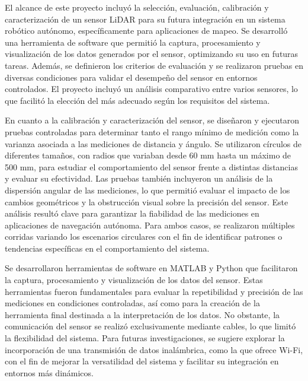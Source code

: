 El alcance de este proyecto incluyó la selección, evaluación, calibración y caracterización de un sensor LiDAR para su futura integración en un sistema robótico autónomo, específicamente para aplicaciones de mapeo. Se desarrolló una herramienta de software que permitió la captura, procesamiento y visualización de los datos generados por el sensor, optimizando su uso en futuras tareas. Además, se definieron los criterios de evaluación y se realizaron pruebas en diversas condiciones para validar el desempeño del sensor en entornos controlados. El proyecto incluyó un análisis comparativo entre varios sensores, lo que facilitó la elección del más adecuado según los requisitos del sistema.

En cuanto a la calibración y caracterización del sensor, se diseñaron y ejecutaron pruebas controladas para determinar tanto el rango mínimo de medición como la varianza asociada a las mediciones de distancia y ángulo. Se utilizaron círculos de diferentes tamaños, con radios que variaban desde 60 mm hasta un máximo de 500 mm, para estudiar el comportamiento del sensor frente a distintas distancias y evaluar su efectividad. Las pruebas también incluyeron un análisis de la dispersión angular de las mediciones, lo que permitió evaluar el impacto de los cambios geométricos y la obstrucción visual sobre la precisión del sensor. Este análisis resultó clave para garantizar la fiabilidad de las mediciones en aplicaciones de navegación autónoma. Para ambos casos, se realizaron múltiples corridas variando los escenarios circulares con el fin de identificar patrones o tendencias específicas en el comportamiento del sistema.

Se desarrollaron herramientas de software en MATLAB y Python que facilitaron la captura, procesamiento y visualización de los datos del sensor. Estas herramientas fueron fundamentales para evaluar la repetibilidad y precisión de las mediciones en condiciones controladas, así como para la creación de la herramienta final destinada a la interpretación de los datos. No obstante, la comunicación del sensor se realizó exclusivamente mediante cables, lo que limitó la flexibilidad del sistema. Para futuras investigaciones, se sugiere explorar la incorporación de una transmisión de datos inalámbrica, como la que ofrece Wi-Fi, con el fin de mejorar la versatilidad del sistema y facilitar su integración en entornos más dinámicos.

